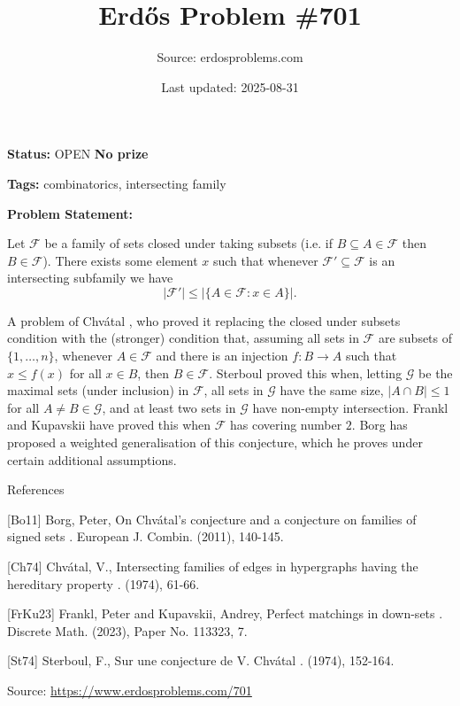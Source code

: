 \documentclass{article}
\title{Erd\H{o}s Problem \#701}
\date{Last updated: 2025-08-31}
\author{Source: erdosproblems.com}
\begin{document}
\maketitle

\noindent\textbf{Status:} OPEN \quad \textbf{No prize}

\noindent\textbf{Tags:} combinatorics, intersecting family

\medskip

\noindent\textbf{Problem Statement:}

Let $\mathcal{F}$ be a family of sets closed under taking subsets (i.e. if $B\subseteq A\in\mathcal{F}$ then $B\in \mathcal{F}$). There exists some element $x$ such that whenever $\mathcal{F}'\subseteq \mathcal{F}$ is an intersecting subfamily we have\[\lvert \mathcal{F}'\rvert \leq \lvert \{ A\in \mathcal{F} : x\in A\}\rvert.\]




A problem of Chv\'{a}tal \cite{Ch74}, who proved it replacing the closed under subsets condition with the (stronger) condition that, assuming all sets in $\mathcal{F}$ are subsets of $\{1,\ldots,n\}$, whenever $A\in \mathcal{F}$ and there is an injection $f:B\to A$ such that $x\leq f(x)$ for all $x\in B$, then $B\in \mathcal{F}$. Sterboul \cite{St74} proved this when, letting $\mathcal{G}$ be the maximal sets (under inclusion) in $\mathcal{F}$, all sets in $\mathcal{G}$ have the same size, $\lvert A\cap B\rvert\leq 1$ for all $A\neq B\in \mathcal{G}$, and at least two sets in $\mathcal{G}$ have non-empty intersection. Frankl and Kupavskii \cite{FrKu23} have proved this when $\mathcal{F}$ has covering number $2$. Borg \cite{Bo11} has proposed a weighted generalisation of this conjecture, which he proves under certain additional assumptions.




References

[Bo11] Borg, Peter, On Chv\'{a}tal's conjecture and a conjecture on families of signed sets . European J. Combin. (2011), 140-145.

[Ch74] Chv\'{a}tal, V., Intersecting families of edges in hypergraphs having the hereditary property . (1974), 61-66.

[FrKu23] Frankl, Peter and Kupavskii, Andrey, Perfect matchings in down-sets . Discrete Math. (2023), Paper No. 113323, 7.

[St74] Sterboul, F., Sur une conjecture de V. Chv\'{a}tal . (1974), 152-164.


\bigskip
\noindent\small{Source: \url{https://www.erdosproblems.com/701}}
\end{document}
